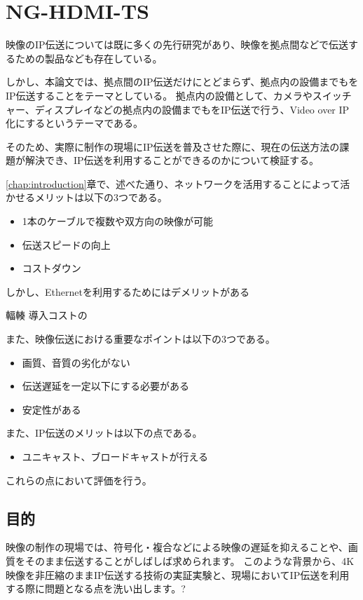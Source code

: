 \chapter{NG-HDMI-TS}
\label{chap:network-transmission}

映像のIP伝送については既に多くの先行研究があり、映像を拠点間などで伝送するための製品なども存在している。

しかし、本論文では、拠点間のIP伝送だけにとどまらず、拠点内の設備までもをIP伝送することをテーマとしている。
拠点内の設備として、カメラやスイッチャー、ディスプレイなどの拠点内の設備までもをIP伝送で行う、Video over IP化にするというテーマである。

そのため、実際に制作の現場にIP伝送を普及させた際に、現在の伝送方法の課題が解決でき、IP伝送を利用することができるのかについて検証する。


\ref{chap:introduction}章で、述べた通り、ネットワークを活用することによって活かせるメリットは以下の3つである。

\begin{itemize}
  \item 1本のケーブルで複数や双方向の映像が可能
  \item 伝送スピードの向上
  \item コストダウン
\end{itemize}

しかし、Ethernetを利用するためにはデメリットがある

輻輳
導入コストの

また、映像伝送における重要なポイントは以下の3つである。

\begin{itemize}
  \item 画質、音質の劣化がない
  \item 伝送遅延を一定以下にする必要がある
  \item 安定性がある
\end{itemize}

また、IP伝送のメリットは以下の点である。

\begin{itemize}
  \item ユニキャスト、ブロードキャストが行える
\end{itemize}

これらの点において評価を行う。

\section{目的}

映像の制作の現場では、符号化・複合などによる映像の遅延を抑えることや、画質をそのまま伝送することがしばしば求められます。
このような背景から、4K映像を非圧縮のままIP伝送する技術の実証実験と、現場においてIP伝送を利用する際に問題となる点を洗い出します。?


